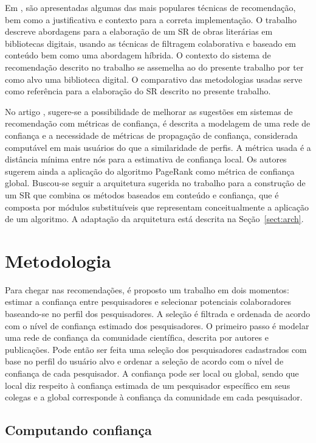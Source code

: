 \documentclass[12pt]{article}
\begin{document}
Em \cite{primo2006tecnicas}, são apresentadas algumas das mais populares técnicas de recomendação, bem como a justificativa e contexto para a correta implementação. O trabalho descreve abordagens para a elaboração de um SR de obras literárias em bibliotecas digitais, usando as técnicas de filtragem colaborativa e baseado em conteúdo bem como uma abordagem híbrida. O contexto do sistema de recomendação descrito no trabalho se assemelha ao do presente trabalho por ter como alvo uma 
biblioteca digital. O comparativo das metodologias usadas serve como referência para a elaboração do SR descrito no presente trabalho.

No artigo \cite{massa2004trust}, sugere-se a possibilidade de melhorar as sugestões em sistemas de recomendação com métricas de confiança, é descrita a modelagem de uma rede de confiança e a necessidade de métricas de propagação de confiança, considerada  computável em mais usuários do que a similaridade de perfis. A métrica usada é a distância mínima entre nós para a estimativa de confiança local. Os autores sugerem ainda a aplicação do algoritmo PageRank \cite{page1999pagerank} como métrica de confiança global. Buscou-se seguir a arquitetura sugerida no trabalho para a construção de um SR que combina os métodos baseados em conteúdo e confiança, que é composta por módulos substituíveis que representam conceitualmente a aplicação de um algoritmo. A adaptação da arquitetura está descrita na Seção~\ref{sect:arch}.

\section{Metodologia}

Para chegar nas recomendações, é proposto um trabalho em dois momentos: estimar a confiança entre pesquisadores e selecionar potenciais colaboradores baseando-se no perfil dos pesquisadores. A seleção é filtrada e ordenada de acordo com o nível de confiança estimado dos pesquisadores. O primeiro passo é modelar uma rede de confiança da comunidade científica, descrita por autores e publicações. Pode então ser feita uma seleção dos pesquisadores cadastrados com base no perfil do usuário alvo e ordenar a seleção de acordo com o nível de confiança de cada pesquisador. A confiança pode ser local ou global, sendo que local diz respeito à confiança estimada de um pesquisador específico em seus colegas e a global corresponde à confiança da comunidade em cada pesquisador. 

\subsection{Computando confiança} \label{sect:computing-trust}
\end{document}
